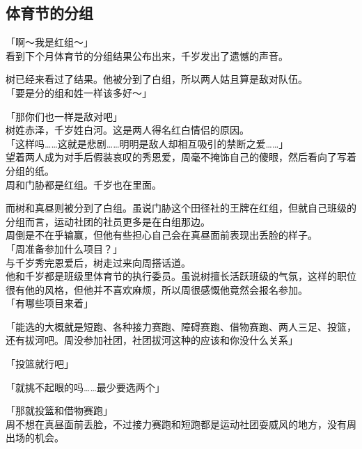 \subsection{体育节的分组}

「啊～我是红组～」\\

看到下个月体育节的分组结果公布出来，千岁发出了遗憾的声音。

树已经来看过了结果。他被分到了白组，所以两人姑且算是敌对队伍。\\

「要是分的组和姓一样该多好～」

「那你们也一样是敌对吧」\\

树姓赤泽，千岁姓白河。这是两人得名红白情侣的原因。\\

「这样吗……这就是悲剧……明明是敌人却相互吸引的禁断之爱……」\\

望着两人成为对手后假装哀叹的秀恩爱，周毫不掩饰自己的傻眼，然后看向了写着分组的纸。\\

周和门胁都是红组。千岁也在里面。

而树和真昼则被分到了白组。虽说门胁这个田径社的王牌在红组，但就自己班级的分组而言，运动社团的社员更多是在白组那边。\\

周倒是不在乎输赢，但他有些担心自己会在真昼面前表现出丢脸的样子。\\

「周准备参加什么项目？」\\

与千岁秀完恩爱后，树走过来向周搭话道。\\

他和千岁都是班级里体育节的执行委员。虽说树擅长活跃班级的气氛，这样的职位很有他的风格，但他并不喜欢麻烦，所以周很感慨他竟然会报名参加。\\

「有哪些项目来着」

「能选的大概就是短跑、各种接力赛跑、障碍赛跑、借物赛跑、两人三足、投篮，还有拔河吧。周没参加社团，社团拔河这种的应该和你没什么关系」

「投篮就行吧」

「就挑不起眼的吗……最少要选两个」

「那就投篮和借物赛跑」\\

周不想在真昼面前丢脸，不过接力赛跑和短跑都是运动社团耍威风的地方，没有周出场的机会。

